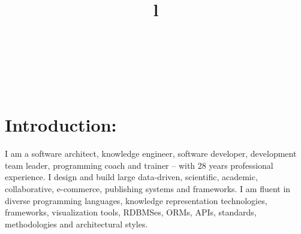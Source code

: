 \documentclass[line,margin]{res}
\begin{document}
 \address{\url{http://smurp.com}\\ Berlin\\
 \href{callto:+491625808994}{+491625808994}\\
  {\tt \href{mailto:smurp@smurp.com}{smurp@smurp.com}}}

\resumewidth=7in
\textheight=10.2in
\begin{resume}

\begin{format}
\title{l}\\
\\
\body\\
\end{format}


\section{Introduction:}
\begin{par}

I am a software architect, knowledge engineer,
software developer, development team leader, programming coach
and trainer -- with 28 years professional experience.
I design and build large data-driven, scientific, academic,
collaborative, e-commerce, publishing systems and frameworks.
I am fluent in diverse programming languages, knowledge
representation technologies, frameworks, visualization tools, RDBMSes,
ORMs, APIs, standards, methodologies and architectural styles.

\begin{comment}
Examples of my work include:
  a vehicle fleet tracking system with RESTful API;
  multiple dynamic knowledge visualization systems;
  a custom database publishing system used by the largest real estate
    markets in Western Canada;
  real-estate systems powered by his own RETS implementation;
  a large bibliographic collaboration system seeded with Library of Congress data;
  a Laboratory Information Management System for disease diagnosis which
    captured, processed and reported on disparate scientific data streams;
  recruiting management systems;
  numerous B2B and B2C e-commerce technologies and systems
    (handling both digital and tangible goods);
  and many other projects involving sophisticated data-sets and processing.
\end{comment}


\end{par}
\end{resume}
\end{document}
